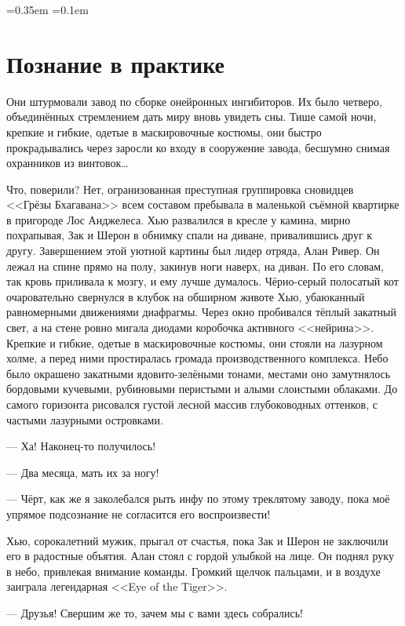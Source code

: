 \documentclass[openany, oneside]{book}
\begin{document}
\font=0.35em
\font=0.1em

\chapter{Познание в практике}

Они штурмовали завод по сборке онейронных ингибиторов. Их было четверо, объединённых стремлением дать миру вновь увидеть сны. Тише самой ночи, крепкие и гибкие, одетые в маскировочные костюмы, они быстро прокрадывались через заросли ко входу в сооружение завода, бесшумно снимая охранников из винтовок\dots

Что, поверили? Нет, огранизованная преступная группировка сновидцев <<Грёзы Бхагавана>> всем составом пребывала в маленькой съёмной квартирке в пригороде Лос Анджелеса. Хью развалился в кресле у камина, мирно похрапывая, Зак и Шерон в обнимку спали на диване, привалившись друг к другу. Завершением этой уютной картины был лидер отряда, Алан Ривер. Он лежал на спине прямо на полу, закинув ноги наверх, на диван. По его словам, так кровь приливала к мозгу, и ему лучше думалось. Чёрно-серый полосатый кот очаровательно свернулся в клубок на обширном животе Хью, убаюканный равномерными движениями диафрагмы. Через окно пробивался тёплый закатный свет, а на стене ровно мигала диодами коробочка активного <<нейрина>>.\\

Крепкие и гибкие, одетые в маскировочные костюмы, они стояли на лазурном холме, а перед ними простиралась громада производственного комплекса. Небо было окрашено закатными ядовито-зелёными тонами, местами оно замутнялось бордовыми кучевыми, рубиновыми перистыми и алыми слоистыми облаками. До самого горизонта рисовался густой лесной массив глубоководных оттенков, с частыми лазурными островками.

--- Ха! Наконец-то получилось!

--- Два месяца, мать их за ногу!

--- Чёрт, как же я заколебался рыть инфу по этому треклятому заводу, пока моё упрямое подсознание не согласится его воспроизвести!

Хью, сорокалетний мужик, прыгал от счастья, пока Зак и Шерон не заключили его в радостные объятия. Алан стоял с гордой улыбкой на лице. Он поднял руку в небо, привлекая внимание команды. Громкий щелчок пальцами, и в воздухе заиграла легендарная <<Eye of the Tiger>>.

--- Друзья! Свершим же то, зачем мы с вами здесь собрались!
\end{document}
